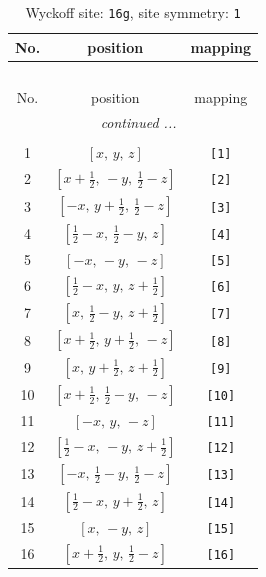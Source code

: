 \documentclass[fleqn,8pt]{jsarticle}
\begin{document}
\begin{longtable}{ccc}
\caption{Wyckoff site: {\tt 16g}, site symmetry: {\tt 1}}
 \\
 \hline \hline
No. & position & mapping \\ \hline \endfirsthead

\multicolumn{2}{l}{\tablename\ \thetable{}} \\
 \hline \hline
No. & position & mapping \\ \hline \endhead

 \hline \hline
\multicolumn{2}{r}{\footnotesize\it continued ...} \\ \endfoot

 \hline \hline
\multicolumn{2}{r}{} \\ \endlastfoot

1 & $\left[ x,\, y,\, z \right]$ & {\tt [1]} \\ \hline
2 & $\left[ x + \frac{1}{2},\, - y,\, \frac{1}{2} - z \right]$ & {\tt [2]} \\ \hline
3 & $\left[ - x,\, y + \frac{1}{2},\, \frac{1}{2} - z \right]$ & {\tt [3]} \\ \hline
4 & $\left[ \frac{1}{2} - x,\, \frac{1}{2} - y,\, z \right]$ & {\tt [4]} \\ \hline
5 & $\left[ - x,\, - y,\, - z \right]$ & {\tt [5]} \\ \hline
6 & $\left[ \frac{1}{2} - x,\, y,\, z + \frac{1}{2} \right]$ & {\tt [6]} \\ \hline
7 & $\left[ x,\, \frac{1}{2} - y,\, z + \frac{1}{2} \right]$ & {\tt [7]} \\ \hline
8 & $\left[ x + \frac{1}{2},\, y + \frac{1}{2},\, - z \right]$ & {\tt [8]} \\ \hline
9 & $\left[ x,\, y + \frac{1}{2},\, z + \frac{1}{2} \right]$ & {\tt [9]} \\ \hline
10 & $\left[ x + \frac{1}{2},\, \frac{1}{2} - y,\, - z \right]$ & {\tt [10]} \\ \hline
11 & $\left[ - x,\, y,\, - z \right]$ & {\tt [11]} \\ \hline
12 & $\left[ \frac{1}{2} - x,\, - y,\, z + \frac{1}{2} \right]$ & {\tt [12]} \\ \hline
13 & $\left[ - x,\, \frac{1}{2} - y,\, \frac{1}{2} - z \right]$ & {\tt [13]} \\ \hline
14 & $\left[ \frac{1}{2} - x,\, y + \frac{1}{2},\, z \right]$ & {\tt [14]} \\ \hline
15 & $\left[ x,\, - y,\, z \right]$ & {\tt [15]} \\ \hline
16 & $\left[ x + \frac{1}{2},\, y,\, \frac{1}{2} - z \right]$ & {\tt [16]} \\
\end{longtable}
\end{document}
